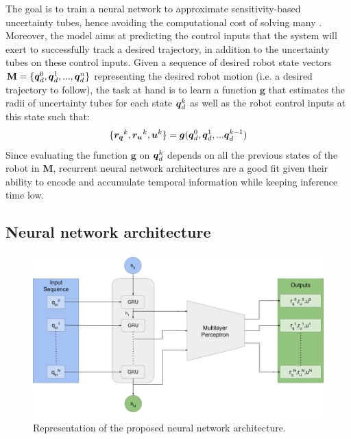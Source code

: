 The goal is to train a neural network to approximate sensitivity-based uncertainty tubes, hence avoiding the computational cost of solving many . 
Moreover, the model aims at predicting the control inputs that the system will exert to successfully track a desired trajectory, in addition to the uncertainty tubes on these control inputs. 
Given a sequence of desired robot state vectors $\textbf{M} = \{\boldsymbol{q}_{d}^0, \boldsymbol{q}_{d}^1, ..., \boldsymbol{q}_{d}^n\}$ representing the desired robot motion (i.e. a desired trajectory to follow), the task at hand is to learn a function $\boldsymbol{g}$ that estimates the radii of uncertainty tubes for each state $\boldsymbol{q}_{d}^k$ as well as the robot control inputs at this state such that:
\begin{equation}\label{eq:prob_statement}
\{\boldsymbol{r_q}^{k}, \boldsymbol{r_u}^{k},\boldsymbol{u}^{k}\} = \boldsymbol{g}(\boldsymbol{q}_{d}^0, \boldsymbol{q}_{d}^1, ... \boldsymbol{q}_{d}^{k-1})
\end{equation}
Since evaluating the function $\boldsymbol{g}$ on $\boldsymbol{q}_{d}^k$ depends on all the previous states of the robot in $\textbf{M}$, recurrent neural network architectures are a good fit given their ability to encode and accumulate temporal information while keeping inference time low.

\subsection{Neural network architecture}\label{sec:architecture}

\begin{figure} [htp]
    \centering
    \includegraphics[width=0.8\linewidth]{figures/learning_quadrotor/SensiNN_GRU.png}%
    \caption{Representation of the proposed neural network architecture.
    }%
    \label{fig: NN}%
\end{figure}

